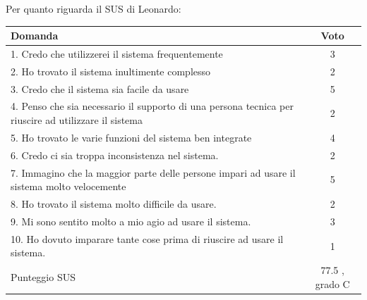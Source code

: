 \documentclass[../Report.tex]{subfiles}
\begin{document}
    Per quanto riguarda il SUS di Leonardo:
    \begin{table}[H]
        \begin{tabular}{|p{10cm}|c|}
            \hline
            \textbf{Domanda} & \textbf{Voto}\\
            \hline
            1. \cellcolor{green} Credo che utilizzerei il sistema frequentemente & 3\\
            \hline
            2. \cellcolor{red} Ho trovato il sistema inultimente complesso & 2 \\
            \hline
            3. \cellcolor{green} Credo che il sistema sia facile da usare & 5 \\
            \hline
            4. \cellcolor{red} Penso che sia necessario il supporto di una persona tecnica per riuscire ad utilizzare il sistema & 2 \\
            \hline
            5. \cellcolor{green} Ho trovato le varie funzioni del sistema ben integrate & 4 \\
            \hline
            6. \cellcolor{red} Credo ci sia troppa inconsistenza nel sistema. & 2\\
            \hline
            7. \cellcolor{green} Immagino che la maggior parte delle persone impari ad usare il sistema molto velocemente & 5 \\
            \hline
            8. \cellcolor{red} Ho trovato il sistema molto difficile da usare. & 2 \\
            \hline
            9. \cellcolor{green} Mi sono sentito molto a mio agio ad usare il sistema. & 3\\
            \hline
            10. \cellcolor{red} Ho dovuto imparare tante cose prima di riuscire ad usare il sistema. & 1 \\ 
            \hline
            Punteggio SUS & 77.5 , grado C \\
            \hline
        \end{tabular}
    \end{table}
\end{document}
